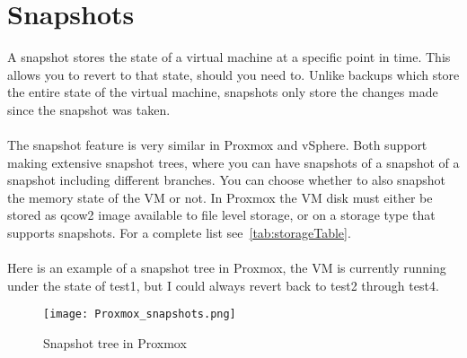 \section{Snapshots}

A snapshot stores the state of a virtual machine at a specific point in time. This allows you to revert to that state, should you need to. Unlike backups which store the entire state of the virtual machine, snapshots only store the changes made since the snapshot was taken.
\\\\
The snapshot feature is very similar in Proxmox and vSphere. Both support making extensive snapshot trees, where you can have snapshots of a snapshot of a snapshot including different branches. You can choose whether to also snapshot the memory state of the VM or not. In Proxmox the VM disk must either be stored as qcow2 image available to file level storage, or on a storage type that supports snapshots. For a complete list see~\ref{tab:storageTable}.
\\\\
Here is an example of a snapshot tree in Proxmox, the VM is currently running under the state of test1, but I could always revert back to test2 through test4.

\begin{figure}[H]
	\centering
	\texttt{[image: Proxmox\_snapshots.png]} %
	\caption{Snapshot tree in Proxmox} %
	\label{fig:Snapshot tree in Proxmox} %
\end{figure}